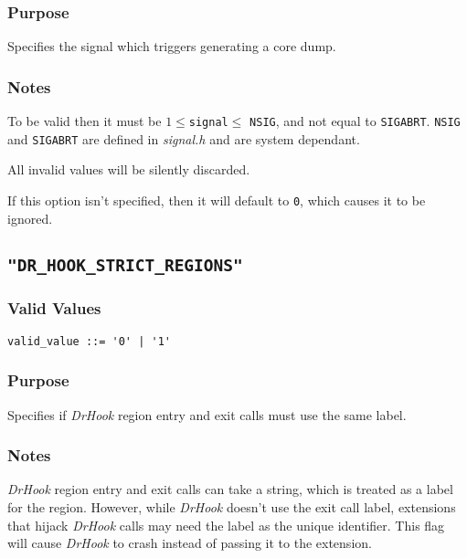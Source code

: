 \subsubsection{Purpose}
\vspace{-2ex}
Specifies the signal which triggers generating a core dump.

\vspace{-2ex}
\subsubsection{Notes}
\vspace{-2ex}
To be valid then it must be $1 \leq $\verb|signal|$ \leq$ \verb+NSIG+, and not equal to \verb|SIGABRT|. \verb|NSIG| and \verb|SIGABRT| are defined in \textit{signal.h} and are system dependant.

All invalid values will be silently discarded.

If this option isn't specified, then it will default to \verb|0|, which causes it to be ignored.



\subsection{\texttt{"DR\_HOOK\_STRICT\_REGIONS"}}
\label{section:flags:DR_HOOK_STRICT_REGIONS}
\vspace{-2ex}
\subsubsection{Valid Values}
\vspace{-2ex}
\verb+valid_value ::= '0' | '1'+ 

\vspace{-2ex}
\subsubsection{Purpose}
\vspace{-2ex}
Specifies if \textit{DrHook} region entry and exit calls must use the same label.

\vspace{-2ex}
\subsubsection{Notes}
\vspace{-2ex}
\textit{DrHook} region entry and exit calls can take a string, which is treated as a label for the region. However, while \textit{DrHook} doesn't use the exit call label, extensions that hijack \textit{DrHook} calls may need the label as the unique identifier. This flag will cause \textit{DrHook} to crash instead of passing it to the extension.

